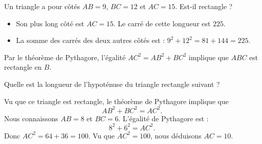 \begin{example}
    Un triangle a pour côtés \( AB=9\), \( BC=12\) et \( AC=15\). Est-il rectangle ?
    \begin{itemize}
        \item Son plus long côté est \( AC=15\). Le carré de cette longueur est \( 225\).
        \item La somme des carrés des deux autres côtés est : \( 9^2+12^2=81+144=225\).
    \end{itemize}
    Par le théorème de Pythagore, l'égalité \( AC^2=AB^2+BC^2\) implique que \( ABC\) est rectangle en \( B\).
\end{example}

\begin{example}
    Quelle est la longueur de l'hypoténuse du triangle rectangle suivant ?
    \begin{center}
        
    \end{center}
    Vu que ce triangle est rectangle, le théorème de Pythagore implique que
    \begin{equation}
        AB^2+BC^2=AC^2.
    \end{equation}
    Nous connaissons \( AB=8\) et \( BC=6\). L'égalité de Pythagore est :
    \begin{equation}
        8^2+6^2=AC^2.
    \end{equation}
    Donc \( AC^2=64+36=100\). Vu que \( AC^2=100\), nous déduisons \( AC=10\).
\end{example}
